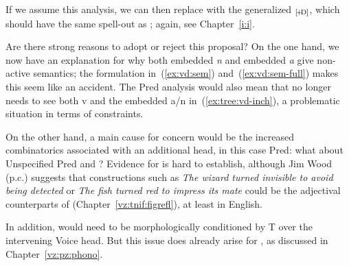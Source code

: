 \begin{exe}
\begin{xlist}
\begin{xlist}
\begin{exe}
\begin{exe}
\begin{xlist}
\begin{exe}
\begin{xlist}
\begin{exe}
\begin{xlist}
\begin{xlist}
\begin{exe}
\begin{xlist}
\begin{exe}
\begin{xlist}
\begin{exe}
\begin{exe}
\begin{exe}
\begin{xlist}
\begin{exe}
\begin{exe}
\begin{xlist}
\begin{xlist}
\begin{exe}
\begin{xlist}
\begin{exe}
\begin{exe}
\begin{exe}
\begin{xlist}
\begin{exe}
\begin{exe}
\begin{xlist}
\begin{exe}
\begin{xlist}
\begin{exe}
\begin{xlist}
\begin{exe}
\begin{xlist}
\begin{exe}
\begin{exe}
\begin{xlist}
\begin{exe}
\begin{exe}
\begin{xlist}
\begin{xlist}
\begin{exe}
\begin{xlist}
\begin{xlist}
\begin{exe}
\begin{xlist}
\begin{exe}
\begin{xlist}
\begin{exe}
\begin{xlist}
\begin{exe}
\begin{xlist}
\begin{exe}
\begin{exe}
\begin{exe}
\begin{exe}
\begin{xlist}
\begin{exe}
\begin{exe}
\begin{xlist}
\begin{xlist}
\begin{exe}
If we assume this analysis, we can then replace {\predd} with the generalized \emph{}$_{\text{[\!+\!D]}}$, which should have the same spell-out as {\vd}; again, see Chapter~\ref{i:i}.

Are there strong reasons to adopt or reject this proposal? On the one hand, we now have an explanation for why both embedded \emph{n} and embedded \emph{a} give {\thif} non-active semantics; the formulation in~(\ref{ex:vd:sem}) and~(\ref{ex:vd:sem-full}) makes this seem like an accident. The Pred analysis would also mean that {\vd} no longer needs to see both v and the embedded a/n in~(\ref{ex:tree:vd-inch}), a problematic situation in terms of  constraints.

On the other hand, a main cause for concern would be the increased combinatorics associated with an additional head, in this case Pred: what about Unspecified Pred and {\predz}? Evidence for {\predz} is hard to establish, although Jim Wood (p.c.) suggests that constructions such as \emph{The wizard turned invisible to avoid being detected} or \emph{The fish turned red to impress its mate} could be the adjectival counterparts of  (Chapter~\ref{vz:tnif:figrefl}), at least in English.

In addition, {\predd} would need to be morphologically conditioned by T over the intervening Voice head. But this issue does already arise for {\pz}, as discussed in Chapter~\ref{vz:pz:phono}.



\end{exe}
\end{xlist}
\end{xlist}
\end{exe}
\end{exe}
\end{xlist}
\end{exe}
\end{exe}
\end{exe}
\end{exe}
\end{xlist}
\end{exe}
\end{xlist}
\end{exe}
\end{xlist}
\end{exe}
\end{xlist}
\end{exe}
\end{xlist}
\end{xlist}
\end{exe}
\end{xlist}
\end{xlist}
\end{exe}
\end{exe}
\end{xlist}
\end{exe}
\end{exe}
\end{xlist}
\end{exe}
\end{xlist}
\end{exe}
\end{xlist}
\end{exe}
\end{xlist}
\end{exe}
\end{exe}
\end{xlist}
\end{exe}
\end{exe}
\end{exe}
\end{xlist}
\end{exe}
\end{xlist}
\end{xlist}
\end{exe}
\end{exe}
\end{xlist}
\end{exe}
\end{exe}
\end{exe}
\end{xlist}
\end{exe}
\end{xlist}
\end{exe}
\end{xlist}
\end{xlist}
\end{exe}
\end{xlist}
\end{exe}
\end{xlist}
\end{exe}
\end{exe}
\end{xlist}
\end{xlist}
\end{exe}

